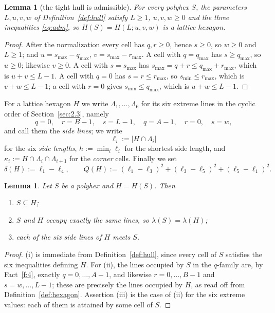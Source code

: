 \documentclass[11pt]{article}
\theoremstyle{plain}
\newtheorem{lemma}[theorem]{Lemma}
\theoremstyle{definition}
\theoremstyle{remark}
\begin{document}
\begin{lemma}[the tight hull is admissible]\label{lem:tightadm}
For every polyhex \(S\), the parameters \(L,u,v,w\) of Definition~\ref{def:hull} satisfy
\(L\ge1\), \(u,v,w\ge0\) and the three inequalities \eqref{eq:adm}, so
\(H(S)=H(L;u,v,w)\) is a lattice hexagon.
\end{lemma}

\begin{proof}
After the normalization every cell has \(q,r\ge0\), hence \(s\ge0\), so \(w\ge0\) and
\(L\ge1\); and \(u=s_{\max}-q_{\max}\), \(v=s_{\max}-r_{\max}\). A cell with
\(q=q_{\max}\) has \(s\ge q_{\max}\), so \(u\ge0\); likewise \(v\ge0\). A cell with
\(s=s_{\max}\) has \(s_{\max}=q+r\le q_{\max}+r_{\max}\), which is \(u+v\le L-1\). A cell
with \(q=0\) has \(s=r\le r_{\max}\), so \(s_{\min}\le r_{\max}\), which is \(v+w\le L-1\);
a cell with \(r=0\) gives \(s_{\min}\le q_{\max}\), which is \(u+w\le L-1\).
\end{proof}

For a lattice hexagon \(H\) we write \(\Lambda_{1},\dots,\Lambda_{6}\) for its six extreme
lines in the cyclic order of Section~\ref{sec:2.3}, namely
\[
   q=0,\quad r=B-1,\quad s=L-1,\quad q=A-1,\quad r=0,\quad s=w ,
\]
and call them the \emph{side lines}; we write
\[
   \ell_{i}:=|H\cap\Lambda_{i}|
\]
for the six \emph{side lengths}, \(h:=\min_{i}\ell_{i}\) for the shortest side length, and
\(\kappa_{i}:=H\cap\Lambda_{i}\cap\Lambda_{i+1}\) for the \emph{corner} cells. Finally we
set
\[
   \delta(H):=\ell_{1}-\ell_{4},
   \qquad
   Q(H):=(\ell_{1}-\ell_{3})^{2}+(\ell_{3}-\ell_{5})^{2}+(\ell_{5}-\ell_{1})^{2} .
\]

\begin{lemma}\label{lem:hull}
Let \(S\) be a polyhex and \(H=H(S)\). Then
\begin{enumerate}
\item[(i)] \(S\subseteq H\);
\item[(ii)] \(S\) and \(H\) occupy exactly the same lines, so \(\lambda(S)=\lambda(H)\);
\item[(iii)] each of the six side lines of \(H\) meets \(S\).
\end{enumerate}
\end{lemma}

\begin{proof}
(i) is immediate from Definition~\ref{def:hull}, since every cell of \(S\) satisfies the
six inequalities defining \(H\). For (ii), the lines occupied by \(S\) in the \(q\)-family
are, by Fact~\ref{f:4}, exactly \(q=0,\dots,A-1\), and likewise \(r=0,\dots,B-1\) and
\(s=w,\dots,L-1\); these are precisely the lines occupied by \(H\), as read off from
Definition~\ref{def:hexagon}. Assertion (iii) is the case of (ii) for the six extreme
values: each of them is attained by some cell of \(S\).
\end{proof}
\end{document}
